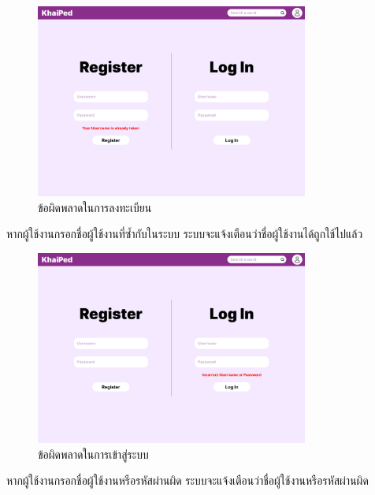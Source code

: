\documentclass[12pt,oneside,openright,a4paper]{cpe-thai-project}
\begin{document}
\pagebreak
\begin{figure}[!h]\centering
	\includegraphics[width=0.8\textwidth, keepaspectratio=true]{image/chap3/ui/login/Home page - Register error.png}
	\caption{ข้อผิดพลาดในการลงทะเบียน}\label{fig:UI_RegisterError}
\end{figure}
\hspace{1cm}
หากผู้ใช้งานกรอกชื่อผู้ใช้งานที่ซ้ำกับในระบบ ระบบจะแจ้งเตือนว่าชื่อผู้ใช้งานได้ถูกใช้ไปแล้ว

\begin{figure}[!h]\centering
	\includegraphics[width=0.8\textwidth, keepaspectratio=true]{image/chap3/ui/login/Home page - Log in error.png}
	\caption{ข้อผิดพลาดในการเข้าสู่ระบบ}\label{fig:UI_LogInError}
\end{figure}
\hspace{1cm}
หากผู้ใช้งานกรอกชื่อผู้ใช้งานหรือรหัสผ่านผิด ระบบจะแจ้งเตือนว่าชื่อผู้ใช้งานหรือรหัสผ่านผิด
\end{document}
